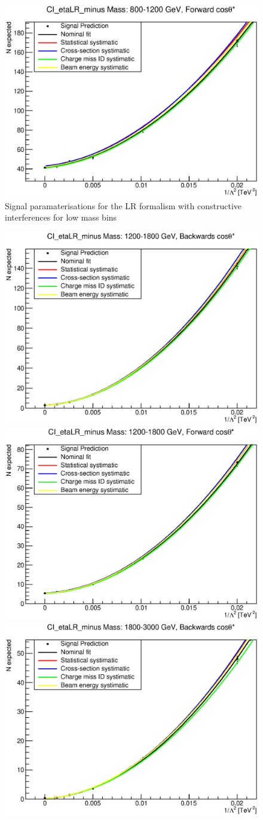\begin{figure}[ht]
			\includegraphics[width=0.49\linewidth]{images/thesis_fits/CI_2D_etaLR_minus_Mass_800-1200_GeV_CTS_0_1.eps}
		\caption{Signal paramaterisations for the LR formalism with constructive interferences for low mass bins}
		\label{fig:parm_LR_m_1}
	\end{figure}

	\begin{figure}[ht]
		\centering
			\includegraphics[width=0.49\linewidth]{images/thesis_fits/CI_2D_etaLR_minus_Mass_1200-1800_GeV_CTS_-1_0.eps}
			\includegraphics[width=0.49\linewidth]{images/thesis_fits/CI_2D_etaLR_minus_Mass_1200-1800_GeV_CTS_0_1.eps}
			\includegraphics[width=0.49\linewidth]{images/thesis_fits/CI_2D_etaLR_minus_Mass_1800-3000_GeV_CTS_-1_0.eps}

\end{figure}
